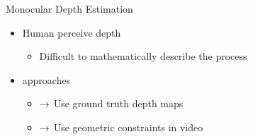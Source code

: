 \documentclass{cubeamer}
\begin{document}
\begin{frame}{Monocular Depth Estimation}
    \begin{itemize}
        \item Human perceive depth 
        \begin{itemize}
            \item Difficult to mathematically describe the process
        \end{itemize}
        \item {} approaches
        \begin{itemize}
            \item {} $\rightarrow$ Use ground truth depth maps
            \item {} $\rightarrow$ Use geometric constraints in video
        \end{itemize}
    \end{itemize}
    

\end{frame}
\end{document}
